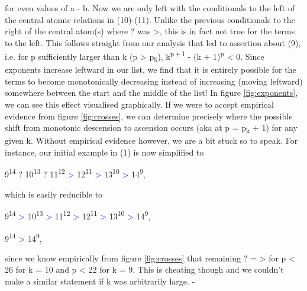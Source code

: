 \documentclass[a4paper,10pt]{article}
\begin{document}
\begin{flushleft}
{{	for even values of a - b. Now we are only left with the conditionals to the left of the central atomic relations in (10)-(11). Unlike the previous conditionals to the right of the central atom(s) where ? was >, this is in fact not true for the terms to the left. This follows straight from our analysis that led to assertion about (9), i.e. for p sufficiently larger than k (p > p\textsubscript{k}), k\textsuperscript{p\,+\,1} - (k + 1)\textsuperscript{p} < 0. Since exponents increase leftward in our list, we find that it is entirely possible for the terms to become monotonically decreasing instead of increasing (moving leftward) somewhere between the start and the middle of the list! In figure \ref{fig:exponents}, we can see this effect visualised graphically. If we were to accept empirical evidence from figure \ref{fig:crosses}, we can determine precisely where the possible shift from monotonic descension to ascension occurs (aka at p = p\textsubscript{k} + 1) for any given k. Without empirical evidence however, we are a bit stuck so to speak. For instance, our initial example in (1) is now simplified to
	\vspace{2mm}
	\begin{center}
	9\textsuperscript{14} ? 10\textsuperscript{13} ? 11\textsuperscript{12} \textcolor{blue}{>} 12\textsuperscript{11} \textcolor{blue}{>} 13\textsuperscript{10} \textcolor{blue}{>} 14\textsuperscript{9},
	\end{center}
	\vspace{2mm}
	which is easily reducible to 
	\vspace{2mm}
	\begin{center}
	9\textsuperscript{14} \textcolor{blue}{>} 10\textsuperscript{13} \textcolor{blue}{>} 11\textsuperscript{12} \textcolor{blue}{>} 12\textsuperscript{11} \textcolor{blue}{>} 13\textsuperscript{10} \textcolor{blue}{>} 14\textsuperscript{9},
	\end{center}
	\vspace{2mm}
	\begin{center}
	9\textsuperscript{14} > 14\textsuperscript{9},
	\end{center}
	\vspace{2mm}
	since we know empirically from figure \ref{fig:crosses} that remaining ? = > for p < 26 for k = 10 and p < 22 for k = 9. This is cheating though and we couldn't make a similar statement if k was arbitrarily large.\linebreak\linebreak
	-
	\linebreak\linebreak
}}
\end{flushleft}
\end{document}
